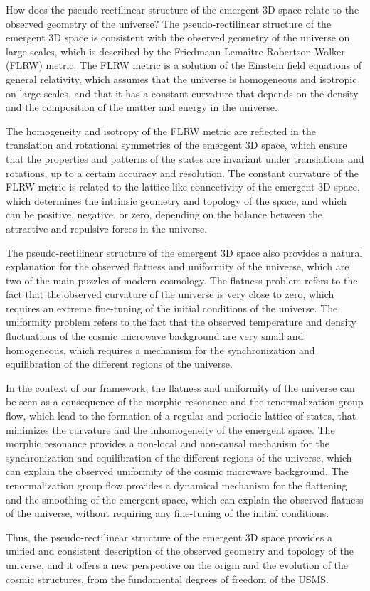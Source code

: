 \begin{tcolorbox}[colback=green!5!white,colframe=green!75!black,title=Question]
How does the pseudo-rectilinear structure of the emergent 3D space relate to the observed geometry of the universe?
\tcblower
The pseudo-rectilinear structure of the emergent 3D space is consistent with the observed geometry of the universe on large scales, which is described by the Friedmann-Lemaître-Robertson-Walker (FLRW) metric. The FLRW metric is a solution of the Einstein field equations of general relativity, which assumes that the universe is homogeneous and isotropic on large scales, and that it has a constant curvature that depends on the density and the composition of the matter and energy in the universe.

The homogeneity and isotropy of the FLRW metric are reflected in the translation and rotational symmetries of the emergent 3D space, which ensure that the properties and patterns of the states are invariant under translations and rotations, up to a certain accuracy and resolution. The constant curvature of the FLRW metric is related to the lattice-like connectivity of the emergent 3D space, which determines the intrinsic geometry and topology of the space, and which can be positive, negative, or zero, depending on the balance between the attractive and repulsive forces in the universe.

The pseudo-rectilinear structure of the emergent 3D space also provides a natural explanation for the observed flatness and uniformity of the universe, which are two of the main puzzles of modern cosmology. The flatness problem refers to the fact that the observed curvature of the universe is very close to zero, which requires an extreme fine-tuning of the initial conditions of the universe. The uniformity problem refers to the fact that the observed temperature and density fluctuations of the cosmic microwave background are very small and homogeneous, which requires a mechanism for the synchronization and equilibration of the different regions of the universe.

In the context of our framework, the flatness and uniformity of the universe can be seen as a consequence of the morphic resonance and the renormalization group flow, which lead to the formation of a regular and periodic lattice of states, that minimizes the curvature and the inhomogeneity of the emergent space. The morphic resonance provides a non-local and non-causal mechanism for the synchronization and equilibration of the different regions of the universe, which can explain the observed uniformity of the cosmic microwave background. The renormalization group flow provides a dynamical mechanism for the flattening and the smoothing of the emergent space, which can explain the observed flatness of the universe, without requiring any fine-tuning of the initial conditions.

Thus, the pseudo-rectilinear structure of the emergent 3D space provides a unified and consistent description of the observed geometry and topology of the universe, and it offers a new perspective on the origin and the evolution of the cosmic structures, from the fundamental degrees of freedom of the USMS.
\end{tcolorbox}

